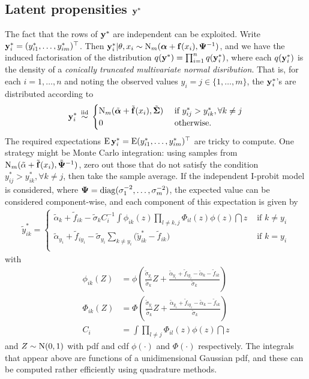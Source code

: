 \subsection[Latent propensities ystar]{Latent propensities ${\mathbf y}^*$}

The fact that the rows of ${\mathbf y}^*$ are independent can be exploited.
Write ${\mathbf y}_i^* = (y_{i1}^*,\dots,y_{im}^*)^\top$.
Then ${\mathbf y}_{i}^*|\theta,x_i \sim \operatorname{N}_m({\bm\alpha} + {\mathbf f}(x_i),{\bm\Psi}^{-1})$, and we have the induced factorisation of the distribution $q({\mathbf y}^*) = \prod_{i=1}^n q({\mathbf y}_i^*)$, where each $q({\mathbf y}_i^*)$ is the density of a \emph{conically truncated multivariate normal disribution}.
That is, for each $i=1,\dots,n$ and noting the observed values $y_i = j \in \{1,\dots,m\}$, the ${\mathbf y}_i^*$'s are distributed according to
\begin{align}\label{eq:ystardist}
  {\mathbf y}_i^* \,\overset{\text{iid}}{\sim}\,
  \begin{cases}
    \operatorname{N}_m(\tilde {{\bm\alpha}} + \tilde {{\mathbf f}}(x_i), \tilde{{\bm\Sigma}}) & \text{ if } y_{ij}^* > y_{ik}^*, \forall k \neq j \\
    0 & \text{ otherwise}. \\
  \end{cases}
\end{align}
The required expectations $\operatorname{E}{\mathbf y}_i^* = \operatorname{E} (y_{i1}^*,\dots,y_{im}^*)^\top$ are tricky to compute.
One strategy might be Monte Carlo integration: using samples from $\operatorname{N}_m(\tilde \alpha + \tilde {{\mathbf f}}(x_i), \tilde{{\bm\Psi}}^{-1})$, zero out those that do not satisfy the condition $y_{ij}^* > y_{ik}^*, \forall k \neq j$, then take the sample average.
If the independent I-probit model is considered, where ${\bm\Psi} = \operatorname{diag}(\sigma_1^{-2},\dots,\sigma_m^{-2})$, the expected value can be considered component-wise, and each component of this expectation is given by
\begin{align}\label{eq:ystarupdate}
  \tilde y_{ik}^* =
  \begin{cases}
    \tilde\alpha_k + \tilde f_{ik} - \tilde\sigma_k C_i^{-1} \displaystyle{  \int \phi_{ik}(z) \prod_{l \neq k,j} \Phi_{il}(z) \phi(z) \dint z }
    &\text{ if } k \neq y_i \\[1.5em]
    \tilde\alpha_{y_i} + \tilde f_{iy_i} - \tilde\sigma_{y_i} \sum_{k \neq y_i} \big(\tilde y_{ik}^* - \tilde f_{ik} \big) 
    &\text{ if } k = y_i \\
  \end{cases}
\end{align}
with 
\begin{align*}
  \phi_{ik}(Z) &= \phi \left(\frac{\tilde\sigma_{y_i}}{\tilde\sigma_k} Z + \frac{\tilde\alpha_{y_i} + \tilde f_{iy_i} - \tilde\alpha_k - \tilde f_{ik}}{\tilde\sigma_k} \right) \\
  \Phi_{ik}(Z) &= \Phi \left(\frac{\tilde\sigma_{y_i}}{\tilde\sigma_k} Z + \frac{\tilde\alpha_{y_i} + \tilde f_{iy_i} - \tilde\alpha_k - \tilde f_{ik}}{\tilde\sigma_k} \right) \\
  C_i &= \int \prod_{l \neq j} \Phi_{il}(z) \phi(z) \dint z
\end{align*}
and $Z \sim \operatorname{N}(0,1)$ with pdf and cdf $\phi(\cdot)$ and $\Phi(\cdot)$ respectively. 
The integrals that appear above are functions of a unidimensional Gaussian pdf, and these can be computed rather efficiently using quadrature methods.

